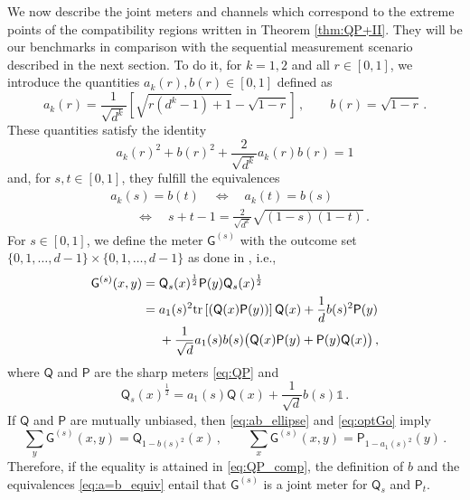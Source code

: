 \documentclass[12pt,reqno]{amsart}
\theoremstyle{definition}
\newcommand{\tr}[1]{{\rm tr}\left[#1\right]} %
\newcommand{\id}{\mathds{1}} %
\newcommand{\Qo}{\mathsf{Q}}%
\newcommand{\Po}{\mathsf{P}}%
\newcommand{\Go}{\mathsf{G}}%
\begin{document}
We now describe the joint meters and channels which correspond to the extreme points of the compatibility regions written in Theorem \ref{thm:QP+II}. 
They will be our benchmarks in comparison with the sequential measurement scenario described in the next section.
To do it, for $k=1,2$ and all $r\in[0,1]$, we introduce the quantities $a_k(r),b(r)\in [0,1]$ defined as
\begin{equation}\label{eq:ab_bis}
a_k(r) = \frac{1}{\sqrt{d^k}}\left[\sqrt{r(d^k-1)+1} - \sqrt{1-r}\right]\,,\qquad b(r) = \sqrt{1-r}\,.
\end{equation}
These quantities satisfy the identity
\begin{equation}\label{eq:ab_ellipse}
a_k(r)^2 + b(r)^2 + \frac{2}{\sqrt{d^k}} a_k(r)b(r) = 1
\end{equation}
and, for $s,t\in [0,1]$, they fulfill the equivalences
\begin{equation}\label{eq:a=b_equiv}
\begin{aligned}
& a_k(s) = b(t) \quad\Leftrightarrow\quad a_k(t) = b(s) \\
& \qquad\Leftrightarrow\quad s+t-1 = \frac{2}{\sqrt{d^k}}\sqrt{(1-s)(1-t)}\,.
\end{aligned}
\end{equation}
For $s\in [0,1]$, we define the meter $\Go^{(s)}$ with the outcome set $\{0,1,\ldots,d-1\}\times\{0,1,\ldots,d-1\}$ as done in \cite[Eq.~(11)]{CaCaTo19}, i.e.,
\begin{equation}\label{eq:optGo}
\begin{aligned}
\Go^{(s)}(x,y) = {} & \Qo_s(x)^{\frac{1}{2}} \Po(y) \Qo_s(x)^{\frac{1}{2}} \\
= {} & a_1(s)^2\tr{(\Qo(x)\Po(y))} \Qo(x) + \frac{1}{d} b(s)^2 \Po(y) \\
& + \frac{1}{\sqrt{d}} a_1(s) b(s) \big(\Qo(x)\Po(y) + \Po(y)\Qo(x)\big) \,,
\end{aligned}
\end{equation}
where $\Qo$ and $\Po$ are the sharp meters \eqref{eq:QP} and
\begin{equation}\label{eq:Q1/2}
\Qo_s(x)^{\frac{1}{2}} = a_1(s)\Qo(x) + \frac{1}{\sqrt{d}} b(s) \id\,.
\end{equation}
If $\Qo$ and $\Po$ are mutually unbiased, then \eqref{eq:ab_ellipse} and \eqref{eq:optGo} imply
\begin{equation}\label{eq:optGo_margins}
\sum_y\Go^{(s)}(x,y) = \Qo_{1-b(s)^2}(x)\,,\qquad \sum_x\Go^{(s)}(x,y) = \Po_{1-a_1(s)^2}(y)\,.
\end{equation}
Therefore, if the equality is attained in \eqref{eq:QP_comp}, the definition of $b$ and the equivalences \eqref{eq:a=b_equiv} entail that $\Go^{(s)}$ is a joint meter for $\Qo_s$ and $\Po_t$.
\end{document}
